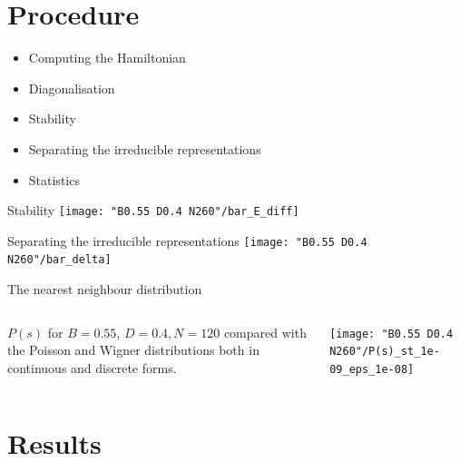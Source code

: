 \documentclass[a4,compress]{beamer}
\begin{document}
\section{Procedure}

\begin{frame}
  \begin{itemize}
    \item Computing the Hamiltonian
    \item Diagonalisation
    \item Stability
    \item Separating the irreducible representations
    \item Statistics
  \end{itemize}
\end{frame}


\begin{frame}{Stability}
  \centering
  \texttt{[image: "B0.55 D0.4 N260"/bar\_E\_diff]}
\end{frame}


\begin{frame}{Separating the irreducible representations}
  \texttt{[image: "B0.55 D0.4 N260"/bar\_delta]}
\end{frame}


\begin{frame}{The nearest neighbour distribution}
  \begin{columns}[c]
  \begin{column}{0.3\textwidth}
    \(P(s)\) for \(B=0.55\), \({D=0.4, N=120}\) compared with the Poisson
    and Wigner distributions both in continuous and discrete forms.
  \end{column}
  \begin{column}{0.7\textwidth}
    \texttt{[image: "B0.55 D0.4 N260"/P(s)\_st\_1e-09\_eps\_1e-08]}  %
  \end{column}
  \end{columns}
\end{frame}

\section{Results}
\end{document}
